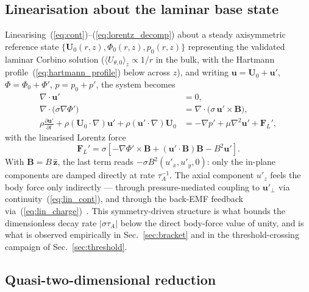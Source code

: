 \documentclass[aps,prl,twocolumn,superscriptaddress]{revtex4-2}
\begin{document}
\subsection{Linearisation about the laminar base state}
\label{sec:linearise}

Linearising~(\ref{eq:cont})--(\ref{eq:lorentz_decomp}) about a steady
axisymmetric reference state
$\{\mathbf{U}_{0}(r,z),\Phi_{0}(r,z),p_{0}(r,z)\}$ representing the
validated laminar Corbino solution
($\langle U_{\theta,0}\rangle_{z} \propto 1/r$ in the bulk, with the
Hartmann profile~(\ref{eq:hartmann_profile}) below across $z$), and
writing $\mathbf{u} = \mathbf{U}_{0} + \mathbf{u}'$,
$\Phi = \Phi_{0} + \Phi'$, $p = p_{0} + p'$, the system becomes
\begin{align}
\nabla\!\cdot\!\mathbf{u}' &= 0, \label{eq:lin_cont}\\
\nabla\!\cdot\!\bigl(\sigma\nabla\Phi'\bigr)
&= \nabla\!\cdot\!\bigl(\sigma\,\mathbf{u}'\!\times\!\mathbf{B}\bigr),
\label{eq:lin_charge}\\
\rho\frac{\partial\mathbf{u}'}{\partial t}
+ \rho(\mathbf{U}_{0}\!\cdot\!\nabla)\mathbf{u}'
+ \rho(\mathbf{u}'\!\cdot\!\nabla)\mathbf{U}_{0}
&= -\nabla p' + \mu\nabla^{2}\mathbf{u}' + \mathbf{F}_{L}',
\label{eq:lin_mom}
\end{align}
with the linearised Lorentz force
\begin{equation}
\mathbf{F}_{L}' = \sigma\!\left[
   -\nabla\Phi'\!\times\!\mathbf{B}
   + (\mathbf{u}'\!\cdot\!\mathbf{B})\mathbf{B}
   - B^{2}\mathbf{u}'\right].
\label{eq:lin_lorentz}
\end{equation}
With $\mathbf{B} = B\,\hat{\mathbf{z}}$, the last term reads
$-\sigma B^{2}(u'_x, u'_y, 0)$: only the in-plane components are damped
directly at rate $\tau_A^{-1}$.  The axial component $u'_z$ feels the
body force only indirectly --- through pressure-mediated coupling to
$\mathbf{u}'_\perp$ via continuity~(\ref{eq:lin_cont}), and through the
back-EMF feedback via~(\ref{eq:lin_charge})~\cite{1,2}.  This
symmetry-driven structure is what bounds the dimensionless decay rate
$|\sigma\tau_A|$ below the direct body-force value of unity, and is
what is observed empirically in Sec.~\ref{sec:bracket} and in the
threshold-crossing campaign of Sec.~\ref{sec:threshold}.

\subsection{Quasi-two-dimensional reduction}
\label{sec:q2d}
\end{document}
